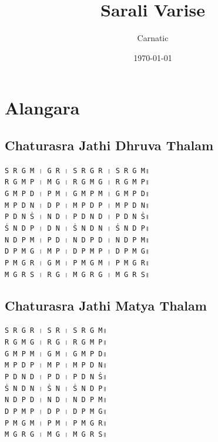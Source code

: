 \documentclass[12pt]{article}
\title{Sarali Varise}
\author{Carnatic}
\date{\today}
\newcommand{\df}[1]{{\devanagarifont#1}}
\begin{document}
\fontsize{18}{21}\selectfont

\section{Alangara}
\subsection{Chaturasra Jathi Dhruva Thalam}
\texttt{S~R~G~M~\df{।}~G~R~\df{।}~S~R~G~R~\df{।}~S~R~G~M\df{॥}}\\
\texttt{R~G~M~P~\df{।}~M~G~\df{।}~R~G~M~G~\df{।}~R~G~M~P\df{॥}}\\
\texttt{G~M~P~D~\df{।}~P~M~\df{।}~G~M~P~M~\df{।}~G~M~P~D\df{॥}}\\
\texttt{M~P~D~N~\df{।}~D~P~\df{।}~M~P~D~P~\df{।}~M~P~D~N\df{॥}}\\
\texttt{P~D~N~Ṡ~\df{।}~N~D~\df{।}~P~D~N~D~\df{।}~P~D~N~Ṡ\df{॥}}\\
\texttt{Ṡ~N~D~P~\df{।}~D~N~\df{।}~Ṡ~N~D~N~\df{।}~Ṡ~N~D~P\df{॥}}\\
\texttt{N~D~P~M~\df{।}~P~D~\df{।}~N~D~P~D~\df{।}~N~D~P~M\df{॥}}\\
\texttt{D~P~M~G~\df{।}~M~P~\df{।}~D~P~M~P~\df{।}~D~P~M~G\df{॥}}\\
\texttt{P~M~G~R~\df{।}~G~M~\df{।}~P~M~G~M~\df{।}~P~M~G~R\df{॥}}\\
\texttt{M~G~R~S~\df{।}~R~G~\df{।}~M~G~R~G~\df{।}~M~G~R~S\df{॥}}\\
\subsection{Chaturasra Jathi Matya Thalam}
\texttt{S~R~G~R~\df{।}~S~R~\df{।}~S~R~G~M\df{॥}}\\
\texttt{R~G~M~G~\df{।}~R~G~\df{।}~R~G~M~P\df{॥}}\\
\texttt{G~M~P~M~\df{।}~G~M~\df{।}~G~M~P~D\df{॥}}\\
\texttt{M~P~D~P~\df{।}~M~P~\df{।}~M~P~D~N\df{॥}}\\
\texttt{P~D~N~D~\df{।}~P~D~\df{।}~P~D~N~Ṡ\df{॥}}\\
\texttt{Ṡ~N~D~N~\df{।}~Ṡ~N~\df{।}~Ṡ~N~D~P\df{॥}}\\
\texttt{N~D~P~D~\df{।}~N~D~\df{।}~N~D~P~M\df{॥}}\\
\texttt{D~P~M~P~\df{।}~D~P~\df{।}~D~P~M~G\df{॥}}\\
\texttt{P~M~G~M~\df{।}~P~M~\df{।}~P~M~G~R\df{॥}}\\
\texttt{M~G~R~G~\df{।}~M~G~\df{।}~M~G~R~S\df{॥}}\\
\end{document}
